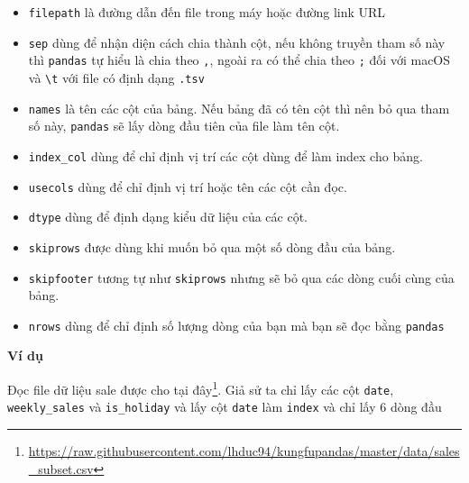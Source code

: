 \documentclass[
]{book}
\renewcommand{\href}[2]{#2\footnote{\url{#1}}}
\begin{document}
\begin{itemize}
\item
  \texttt{filepath} là đường dẫn đến file trong máy hoặc đường link URL
\item
  \texttt{sep} dùng để nhận diện cách chia thành cột, nếu không truyền tham số này thì \texttt{pandas} tự hiểu là chia theo \texttt{\textquotesingle{},\textquotesingle{}}, ngoài ra có thể chia theo \texttt{\textquotesingle{};\textquotesingle{}} đối với macOS và \texttt{\textquotesingle{}\textbackslash{}t\textquotesingle{}} với file có định dạng \texttt{.tsv}
\item
  \texttt{names} là tên các cột của bảng. Nếu bảng đã có tên cột thì nên bỏ qua tham số này, \texttt{pandas} sẽ lấy dòng đầu tiên của file làm tên cột.
\item
  \texttt{index\_col} dùng để chỉ định vị trí các cột dùng để làm index cho bảng.
\item
  \texttt{usecols} dùng để chỉ định vị trí hoặc tên các cột cần đọc.
\item
  \texttt{dtype} dùng để định dạng kiểu dữ liệu của các cột.
\item
  \texttt{skiprows} được dùng khi muốn bỏ qua một số dòng đầu của bảng.
\item
  \texttt{skipfooter} tương tự như \texttt{skiprows} nhưng sẽ bỏ qua các dòng cuối cùng của bảng.
\item
  \texttt{nrows} dùng để chỉ định số lượng dòng của bạn mà bạn sẽ đọc bằng \texttt{pandas}
\end{itemize}

\textbf{Ví dụ}

Đọc file dữ liệu sale được cho tại \href{https://raw.githubusercontent.com/lhduc94/kungfupandas/master/data/sales_subset.csv}{đây}. Giả sử ta chỉ lấy các cột \texttt{date}, \texttt{weekly\_sales} và \texttt{is\_holiday} và lấy cột \texttt{date} làm \texttt{index} và chỉ lấy 6 dòng đầu
\end{document}
